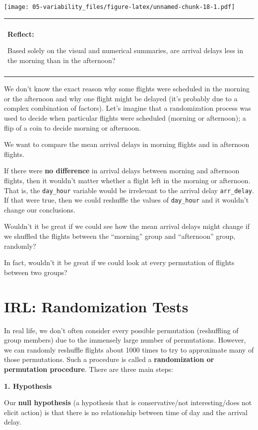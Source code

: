 \documentclass[
]{book}
\newenvironment{reflect}
{
    \begin{center}
    
    \begin{tabular}{|p{0.8\textwidth}|}
    \rowcolor{LightBlue}
    \hline\\
    \rowcolor{LightBlue}
    \textbf{Reflect:}
}
{
    \\\rowcolor{LightBlue}
    \\\hline
    \end{tabular} 
    \end{center}
}
\begin{document}
\texttt{[image: 05-variability\_files/figure-latex/unnamed-chunk-18-1.pdf]}

\begin{reflect}
Based solely on the visual and numerical summaries, are arrival delays
less in the morning than in the afternoon?
\end{reflect}

We don't know the exact reason why some flights were scheduled in the morning or the afternoon and why one flight might be delayed (it's probably due to a complex combination of factors). Let's imagine that a randomization process was used to decide when particular flights were scheduled (morning or afternoon); a flip of a coin to decide morning or afternoon.

We want to compare the mean arrival delays in morning flights and in afternoon flights.

If there were \textbf{no difference} in arrival delays between morning and afternoon flights, then it wouldn't matter whether a flight left in the morning or afternoon. That is, the \texttt{day\_hour} variable would be irrelevant to the arrival delay \texttt{arr\_delay}. If that were true, then we could reshuffle the values of \texttt{day\_hour} and it wouldn't change our conclusions.

Wouldn't it be great if we could see how the mean arrival delays might change if we shuffled the flights between the ``morning'' group and ``afternoon'' group, randomly?

In fact, wouldn't it be great if we could look at every permutation of flights between two groups?

\hypertarget{irl-randomization-tests}{%
\section{IRL: Randomization Tests}\label{irl-randomization-tests}}

In real life, we don't often consider every possible permutation (reshuffling of group members) due to the immensely large number of permutations. However, we can randomly reshuffle flights about 1000 times to try to approximate many of those permutations. Such a procedure is called a \textbf{randomization or permutation procedure}. There are three main steps:

\textbf{1. Hypothesis}

Our \textbf{null hypothesis} (a hypothesis that is conservative/not interesting/does not elicit action) is that there is no relationship between time of day and the arrival delay.
\end{document}
